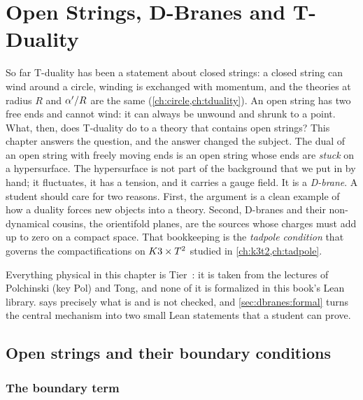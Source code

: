 \chapter{Open Strings, D-Branes and T-Duality}\label{ch:dbranes}

So far T-duality has been a statement about closed strings: a closed string can wind around a
circle, winding is exchanged with momentum, and the theories at radius $R$ and $\alpha'/R$ are the
same (\cref{ch:circle,ch:tduality}). An open string has two free ends and cannot wind: it can
always be unwound and shrunk to a point. What, then, does T-duality do to a theory that contains
open strings? This chapter answers the question, and the answer changed the subject. The dual
of an open string with freely moving ends is an open string whose ends are \emph{stuck} on a
hypersurface. The hypersurface is not part of the background that we put in by hand; it
fluctuates, it has a tension, and it carries a gauge field. It is a \emph{D-brane}. A student
should care for two reasons. First, the argument is a clean example of how a duality forces new
objects into a theory. Second, D-branes and their non-dynamical cousins, the orientifold planes,
are the sources whose charges must add up to zero on a compact space. That bookkeeping is the
\emph{tadpole condition} that governs the compactifications on $K3\times T^2$ studied in
\cref{ch:k3t2,ch:tadpole}.

Everything physical in this chapter is Tier~\TL: it is taken from the lectures of Polchinski
(key Pol) and Tong, and none of it is formalized in this book's Lean library.
 says precisely what is and is not checked, and
\cref{sec:dbranes:formal} turns the central mechanism into two small Lean statements that a
student can prove.

\section{Open strings and their boundary conditions}\label{sec:dbranes:bc}

\subsection{The boundary term}

